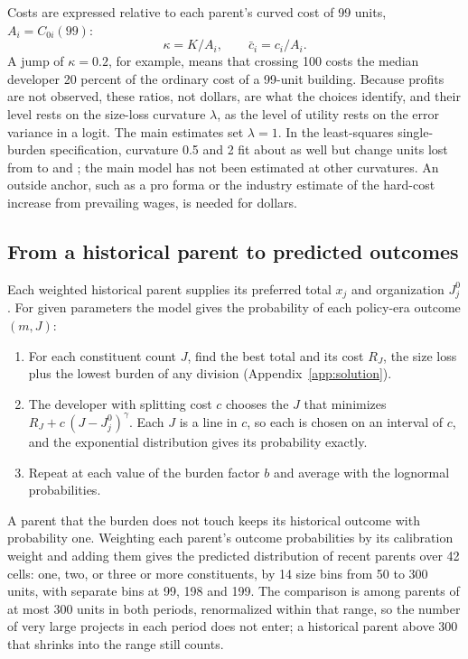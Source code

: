 \documentclass[11pt]{article}
\begin{document}
Costs are expressed relative to each parent's curved cost of 99 units, $A_i=C_{0i}(99)$:
\begin{equation}
\kappa=K/A_i,\qquad
\bar c_i=c_i/A_i .
\label{eq:ratios}
\end{equation}
A jump of $\kappa=0.2$, for example, means that crossing 100 costs the median developer 20 percent of the ordinary cost of a 99-unit building. Because profits are not observed, these ratios, not dollars, are what the choices identify, and their level rests on the size-loss curvature $\lambda$, as the level of utility rests on the error variance in a logit. The main estimates set $\lambda=1$. In the least-squares single-burden specification, curvature 0.5 and 2 fit about as well but change units lost from \LeastSquaresUnitsLost{} to \CurvatureHalfUnitsLost{} and \CurvatureTwoUnitsLost{}; the main model has not been estimated at other curvatures. An outside anchor, such as a pro forma or the industry estimate of the hard-cost increase from prevailing wages, is needed for dollars.

\subsection{From a historical parent to predicted outcomes}

Each weighted historical parent supplies its preferred total $x_j$ and organization $J_j^0$. For given parameters the model gives the probability of each policy-era outcome $(m,J)$:
\begin{enumerate}
\item For each constituent count $J$, find the best total and its cost $R_J$, the size loss plus the lowest burden of any division (Appendix~\ref{app:solution}).
\item The developer with splitting cost $c$ chooses the $J$ that minimizes $R_J+c\,(J-J_j^0)^\gamma$. Each $J$ is a line in $c$, so each is chosen on an interval of $c$, and the exponential distribution gives its probability exactly.
\item Repeat at each value of the burden factor $b$ and average with the lognormal probabilities.
\end{enumerate}
A parent that the burden does not touch keeps its historical outcome with probability one. Weighting each parent's outcome probabilities by its calibration weight and adding them gives the predicted distribution of recent parents over 42 cells: one, two, or three or more constituents, by 14 size bins from 50 to 300 units, with separate bins at 99, 198 and 199. The comparison is among parents of at most 300 units in both periods, renormalized within that range, so the number of very large projects in each period does not enter; a historical parent above 300 that shrinks into the range still counts.
\end{document}
